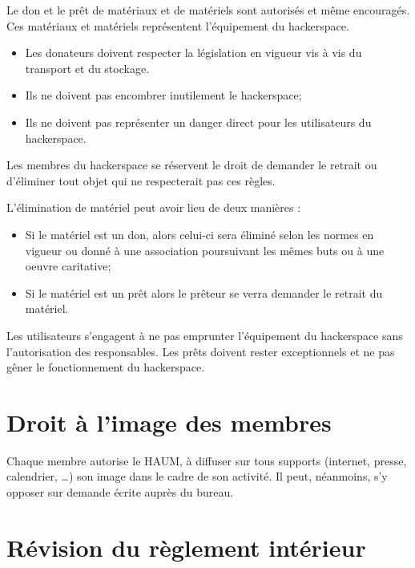 \documentclass[a4paper, 11pt]{article}
\newcommand{\nomHS}{HAUM}
\begin{document}
Le don et le prêt de matériaux et de matériels sont autorisés et même encouragés. Ces matériaux et matériels représentent l'équipement du hackerspace.

\begin{itemize}
    \item Les donateurs doivent respecter la législation en vigueur vis à vis du transport et du stockage.
    \item Ils ne doivent pas encombrer inutilement le hackerspace;
    \item Ils ne doivent pas représenter un danger direct pour les utilisateurs du hackerspace.
\end{itemize}

Les membres du hackerspace se réservent le droit de demander le retrait ou d'éliminer tout objet qui ne respecterait pas ces règles.

L'élimination de matériel peut avoir lieu de deux manières :

\begin{itemize}
    \item Si le matériel est un don, alors celui-ci sera éliminé selon les normes en vigueur ou donné à une association poursuivant les mêmes buts ou à une oeuvre caritative;
    \item Si le matériel est un prêt alors le prêteur se verra demander le retrait du matériel.
\end{itemize}

Les utilisateurs s'engagent à ne pas emprunter l'équipement du hackerspace sans l'autorisation des responsables. Les prêts doivent rester exceptionnels et ne pas gêner le fonctionnement du hackerspace.


\section{Droit à l'image des membres} %

Chaque membre autorise le \nomHS{}, à diffuser sur tous supports (internet, presse, calendrier, …) son image dans le cadre de son activité. Il peut, néanmoins, s'y opposer sur demande écrite auprès du bureau.


\section{Révision du règlement intérieur} %
\end{document}
